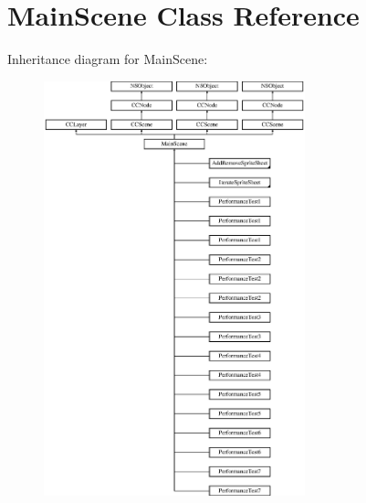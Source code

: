 \hypertarget{interface_main_scene}{\section{Main\-Scene Class Reference}
\label{interface_main_scene}
}
Inheritance diagram for Main\-Scene\-:\begin{figure}[H]
\begin{center}
\leavevmode
\includegraphics[height=12.000000cm]{interface_main_scene}
\end{center}
\end{figure}
